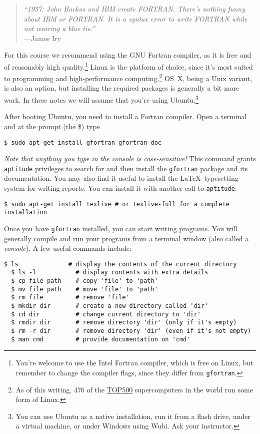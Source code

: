 \label{chap:Getting your toes wet}
\begin{quote}\small
  \emph{``1957: John Backus and IBM create FORTRAN. There's nothing funny about IBM or FORTRAN. It is a syntax error to write FORTRAN while not wearing a blue tie.''} \\ \hspace*{\fill}---James Iry
\end{quote}

For this course we recommend using the GNU Fortran compiler, as it is free and of reasonably high quality.\footnote{You're welcome to use the Intel Fortran compiler, which is free on Linux, but remember to change the compiler flags, since they differ from \texttt{gfortran}.}
Linux is the platform of choice, since it's most suited to programming and high-performance computing.\footnote{As of this writing, 476 of the \href{http://www.top500.org/list/2013/11/}{TOP500} supercomputers in the world run some form of Linux.}
OS~X, being a Unix variant, is also an option, but installing the required packages is generally a bit more work.
In these notes we will assume that you're using Ubuntu.\footnote{You can use Ubuntu as a native installation, run it from a flash drive, under a virtual machine, or under Windows using Wubi.
Ask your instructor.}

After booting Ubuntu, you need to install a Fortran compiler.
Open a terminal and at the prompt (the \$) type
\begin{lstlisting}[style=prompt, nolol]
  $ sudo apt-get install gfortran gfortran-doc
\end{lstlisting}
\emph{Note that anything you type in the console is case-sensitive!}
This command grants \texttt{aptitude} privileges to search for and then install the \texttt{gfortran} package and its documentation.
You may also find it useful to install the \LaTeX\ typesetting system for writing reports.
You can install it with another call to \texttt{aptitude}:
\begin{lstlisting}[style=prompt, nolol]
  $ sudo apt-get install texlive # or texlive-full for a complete installation
\end{lstlisting}

Once you have \texttt{gfortran} installed, you can start writing programs.
You will generally compile and run your programs from a terminal window (also called a \emph{console}).
A few useful commands include:
\begin{lstlisting}[style=prompt, nolol]
  $ ls              # display the contents of the current directory
  $ ls -l           # display contents with extra details
  $ cp file path    # copy 'file' to 'path'
  $ mv file path    # move 'file' to 'path'
  $ rm file         # remove 'file'
  $ mkdir dir       # create a new directory called 'dir'
  $ cd dir          # change current directory to 'dir'
  $ rmdir dir       # remove directory 'dir' (only if it's empty)
  $ rm -r dir       # remove directory 'dir' (even if it's not empty)
  $ man cmd         # provide documentation on 'cmd'
\end{lstlisting}

